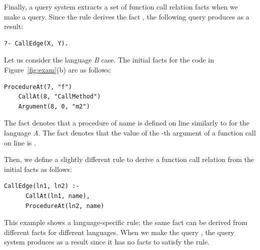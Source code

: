 Finally, a query system extracts a set of function call relation facts when we
make a query. Since the rule derives the fact , the
following query produces  as a result:


\begin{lstlisting}[style=mrule]
    ?- CallEdge(X, Y).
\end{lstlisting}


Let us consider the language {\it B} case.
The initial facts for the code in Figure~\ref{fig:exam}(b) are as follows: 

\begin{lstlisting}[style=mrule]
    ProcedureAt(7, "f")
    CallAt(8, "CallMethod")
    Argument(8, 0, "m2")
\end{lstlisting}

\noindent
The fact  denotes that a procedure of name
 is defined on line  similarly to
 for the language {\it A}.
The fact  denotes that the value of
the -th argument of a function call on line  is .

Then, we define a slightly different rule to derive a function call relation
from the initial facts as follows: 

\begin{lstlisting}[style=mrule]
    CallEdge(ln1, ln2) :-
      CallAt(ln1, name),
      ProcedureAt(ln2, name)
\end{lstlisting}

\noindent
This example shows a language-specific rule;
the same fact  can be derived from different facts for
different languages. When we make the query ,
the query system produces  as a result
since it has no facts to satisfy the rule.

